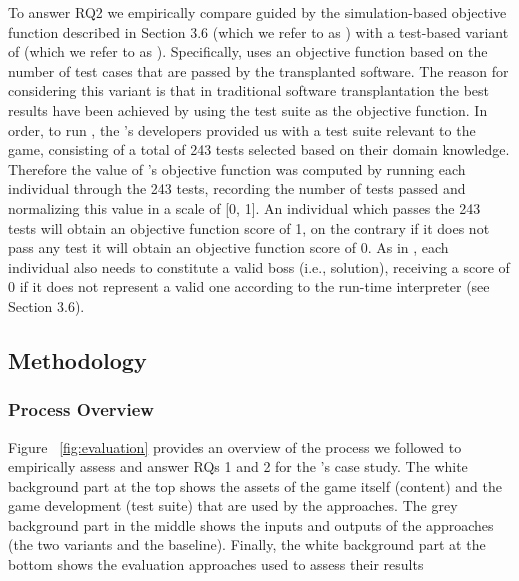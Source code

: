 To answer RQ2 we empirically compare \ApproachName{} guided by the simulation-based objective function described in Section 3.6 (which we refer to as \simhotep{}) with a test-based variant of \ApproachName{} (which we refer to as \timhotep{}). Specifically, \timhotep{} uses an objective function based on the number of test cases that are passed by the transplanted software.  The reason for considering this variant is that in traditional software transplantation the best results have been achieved by using the test suite as the objective function. 
In order, to run \timhotep, the \CaseStudy{}'s developers provided us with a test suite relevant to the game, consisting of a total of 243 tests selected based on their domain knowledge. Therefore the value of \timhotep{}'s objective function was computed by running each individual through the 243 tests, recording the number of tests passed and normalizing this value in a scale of [0, 1]. An individual which passes the 243 tests will obtain an objective function score of 1, on the contrary if it does not pass any test it will obtain an objective function score of 0.  
As in \simhotep{},  each individual also needs to constitute a valid boss (i.e., solution), receiving a score of 0 if it does not represent a valid one according to the run-time interpreter (see Section 3.6).

\subsection{Methodology}

\subsubsection{Process Overview}
Figure ~\ref{fig:evaluation} provides an overview of the process we followed to empirically assess \ApproachName{} and answer RQs 1 and 2 for the \CaseStudy's case study. The white background part at the top shows the assets of the game itself (content) and the game development (test suite) that are used by the approaches. The grey background part in the middle shows the inputs and outputs of the approaches (the two \ApproachName{} variants and the baseline). Finally, the white background part at the bottom shows the evaluation approaches used to assess their results


